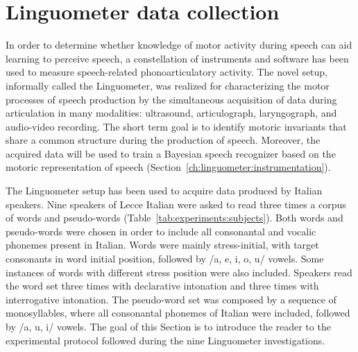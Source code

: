 \section{Linguometer data collection}
\label{ch:experiments}
In order to determine whether knowledge of motor activity during speech
can aid learning to perceive speech, a constellation of instruments and
software has been used to measure speech-related phonoarticulatory activity.
The novel setup, informally called
the Linguometer, was realized for characterizing 
the motor processes of speech production by the simultaneous acquisition of data
during articulation in many modalities: ultrasound, articulograph,
laryngograph, and audio-video recording. 
The short term goal is to identify motoric invariants that share a common 
structure during the production of speech.
Moreover, the acquired data will be used to train a Bayesian speech recognizer
based on the motoric representation of speech (Section~\ref{ch:linguometer:instrumentation}).


The Linguometer setup has been used to acquire data produced by Italian
speakers. 
Nine speakers of Lecce Italian were asked to read three times a corpus of words
and pseudo-words (Table~\ref{tab:experiments:subjects}).
Both words and pseudo-words were chosen in order to include all consonantal and
vocalic phonemes present in Italian. 
Words were mainly stress-initial, with target consonants in word initial 
position, followed by /a, e, i, o, u/ vowels. 
Some instances of words with different stress position were also included.
Speakers read the word set three times with declarative intonation and three 
times with interrogative intonation. 
The pseudo-word set was composed by a sequence of monosyllables, where all 
consonantal phonemes of Italian were included, followed by /a, u, i/ vowels. 
The goal of this Section is to introduce the reader to the experimental protocol
followed during the nine Linguometer investigations.
